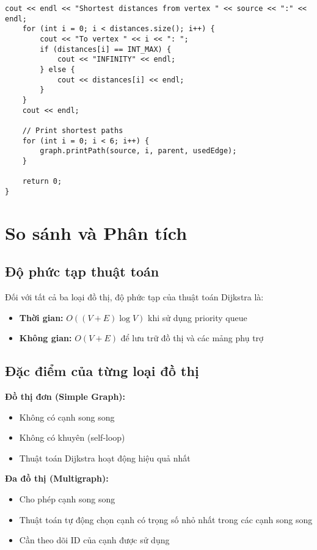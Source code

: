 \documentclass[12pt,a4paper]{article}
\begin{document}
\begin{lstlisting}[caption={Thuật toán Dijkstra cho đồ thị tổng quát}]
    cout << endl << "Shortest distances from vertex " << source << ":" << endl;
    for (int i = 0; i < distances.size(); i++) {
        cout << "To vertex " << i << ": ";
        if (distances[i] == INT_MAX) {
            cout << "INFINITY" << endl;
        } else {
            cout << distances[i] << endl;
        }
    }
    cout << endl;
    
    // Print shortest paths
    for (int i = 0; i < 6; i++) {
        graph.printPath(source, i, parent, usedEdge);
    }
    
    return 0;
}
\end{lstlisting}

\section{So sánh và Phân tích}

\subsection{Độ phức tạp thuật toán}

Đối với tất cả ba loại đồ thị, độ phức tạp của thuật toán Dijkstra là:
\begin{itemize}
\item \textbf{Thời gian:} $O((V + E) \log V)$ khi sử dụng priority queue
\item \textbf{Không gian:} $O(V + E)$ để lưu trữ đồ thị và các mảng phụ trợ
\end{itemize}

\subsection{Đặc điểm của từng loại đồ thị}

\textbf{Đồ thị đơn (Simple Graph):}
\begin{itemize}
\item Không có cạnh song song
\item Không có khuyên (self-loop)
\item Thuật toán Dijkstra hoạt động hiệu quả nhất
\end{itemize}

\textbf{Đa đồ thị (Multigraph):}
\begin{itemize}
\item Cho phép cạnh song song
\item Thuật toán tự động chọn cạnh có trọng số nhỏ nhất trong các cạnh song song
\item Cần theo dõi ID của cạnh được sử dụng
\end{itemize}
\end{document}
